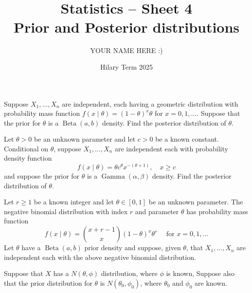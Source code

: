 \documentclass[answers]{exam}
\title{Statistics -- Sheet 4\\Prior and Posterior distributions}
\author{YOUR NAME HERE :)}
\date{Hilary Term 2025}
\begin{document}
\maketitle

\begin{questions}

\question%
Suppose $X_{1}, \ldots, X_{n}$ are independent, each having a geometric distribution with probability mass function $f(x \mid \theta)=(1-\theta)^{x} \theta$ for $x=0,1, \ldots$. Suppose that the prior for $\theta$ is a $\operatorname{Beta}(a, b)$ density. Find the posterior distribution of $\theta$.



\question%
Let $\theta>0$ be an unknown parameter and let $c>0$ be a known constant. Conditional on $\theta$, suppose $X_{1}, \ldots, X_{n}$ are independent each with probability density function \[
	f(x \mid \theta)=\theta c^{\theta} x^{-(\theta+1)}, \quad x \geqslant c
\] and suppose the prior for $\theta$ is a $\operatorname{Gamma}(\alpha, \beta)$ density. Find the posterior distribution of $\theta$.



\question%
Let $r \geqslant 1$ be a known integer and let $\theta \in[0,1]$ be an unknown parameter. The negative binomial distribution with index $r$ and parameter $\theta$ has probability mass function \[
	f(x \mid \theta)=\binom{x+r-1}{x}(1-\theta)^{x} \theta^{r} \quad \text { for } x=0,1, \ldots
\] Let $\theta$ have a $\operatorname{Beta}(a, b)$ prior density and suppose, given $\theta$, that $X_{1}, \ldots, X_{n}$ are independent each with the above negative binomial distribution.


\question%
Suppose that $X$ has a $N(\theta, \phi)$ distribution, where $\phi$ is known, Suppose also that the prior distribution for $\theta$ is $N(\theta_{0}, \phi_{0})$, where $\theta_{0}$ and $\phi_{0}$ are known.
\begin{parts}

\end{parts}
\end{questions}
\end{document}

